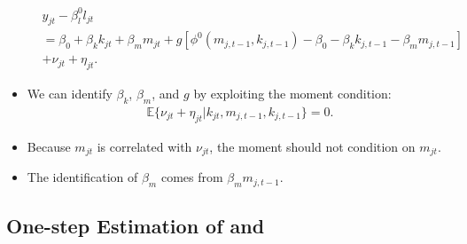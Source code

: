 \documentclass[
]{book}
\begin{document}
\begin{itemize}
\begin{equation}
\begin{split}
  &y_{jt} - \beta_l^0 l_{jt}\\
  & = \beta_0 + \beta_k k_{jt} + \beta_m m_{jt} + g[\phi^0(m_{j, t - 1}, k_{j, t - 1}) - \beta_0 - \beta_k k_{j, t - 1} - \beta_m m_{j, t - 1}]\\
  & + \nu_{jt} + \eta_{jt}.
  \end{split}
  \end{equation}
\item
  We can identify \(\beta_k\), \(\beta_m\), and \(g\) by exploiting the moment condition:
  \begin{equation}
  \begin{split}
  \mathbb{E}\{\nu_{jt} + \eta_{jt} | k_{jt}, m_{j, t - 1}, k_{j,t - 1}\} = 0.
  \end{split}
  \end{equation}
\item
  Because \(m_{jt}\) is correlated with \(\nu_{jt}\), the moment should not condition on \(m_{jt}\).
\item
  The identification of \(\beta_{m}\) comes from \(\beta_m m_{j, t - 1}\).
\end{itemize}

\hypertarget{one-step-estimation-of-olley1996-and-levinsohn2003}{%
\subsection{\texorpdfstring{One-step Estimation of \citet{Olley1996} and \citet{Levinsohn2003}}{One-step Estimation of @Olley1996 and @Levinsohn2003}}\label{one-step-estimation-of-olley1996-and-levinsohn2003}}
\end{document}
